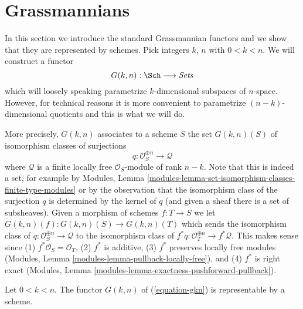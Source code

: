 \section{Grassmannians}
\label{section-grassmannian}

\noindent
In this section we introduce the standard Grassmannian functors and
we show that they are represented by schemes. Pick integers $k$, $n$
with $0 < k < n$. We will construct a functor
\begin{equation}
\label{equation-gkn}
G(k, n) : \Sch \longrightarrow \textit{Sets}
\end{equation}
which will loosely speaking parametrize $k$-dimensional subspaces
of $n$-space. However, for technical reasons it is more convenient
to parametrize $(n - k)$-dimensional quotients and this is what we will
do.

\medskip\noindent
More precisely, $G(k, n)$ associates to a scheme $S$ the set $G(k, n)(S)$
of isomorphism classes of surjections
$$
q : \mathcal{O}_S^{\oplus n} \longrightarrow \mathcal{Q}
$$
where $\mathcal{Q}$ is a finite locally free $\mathcal{O}_S$-module
of rank $n - k$. Note that this is indeed a set, for example by
Modules, Lemma \ref{modules-lemma-set-isomorphism-classes-finite-type-modules}
or by the observation that the isomorphism class of the surjection $q$
is determined by the kernel of $q$ (and given a sheaf there is a set
of subsheaves). Given a morphism of schemes $f : T \to S$ we let
$G(k, n)(f) : G(k, n)(S) \to G(k, n)(T)$ which sends the
isomorphism class of $q : \mathcal{O}_S^{\oplus n} \longrightarrow \mathcal{Q}$
to the isomorphism class of
$f^*q : \mathcal{O}_T^{\oplus n} \longrightarrow f^*\mathcal{Q}$.
This makes sense since  (1) $f^*\mathcal{O}_S = \mathcal{O}_T$,
(2) $f^*$ is additive, (3) $f^*$ preserves locally free modules
(Modules, Lemma \ref{modules-lemma-pullback-locally-free}),
and (4) $f^*$ is right exact
(Modules, Lemma \ref{modules-lemma-exactness-pushforward-pullback}).

\begin{lemma}
\label{lemma-gkn-representable}
Let $0 < k < n$.
The functor $G(k, n)$ of (\ref{equation-gkn}) is representable by a scheme.
\end{lemma}

